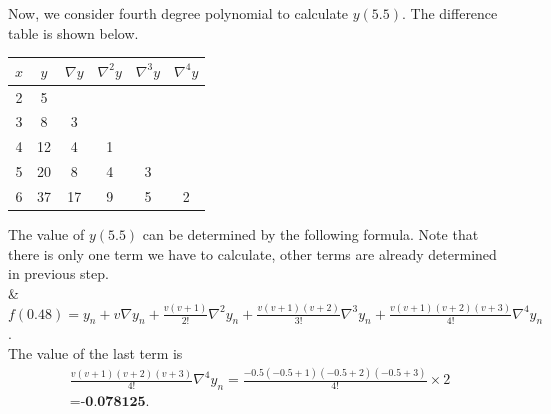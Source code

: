 \documentclass{beamer}
\begin{document}
\begin{frame}{}
    
Now, we consider fourth degree polynomial to calculate $y(5.5)$. The difference table is shown below.

\begin{center}
\begin{tabular}{|c|c|c|c|c|c|}
\hline
$x$ & $y$ & $\nabla y$ & $\nabla^{2} y$ & $\nabla^{3} y$ & $\nabla^{4} y$ \\
\hline
2 & 5 &  &  &  &  \\
\hline
3 & 8 & 3 &  &  &  \\
\hline
4 & 12 & 4 & 1 &  &  \\
\hline
5 & 20 & 8 & 4 & 3 &  \\
\hline
6 & 37 & 17 & 9 & 5 & 2 \\
\hline
\end{tabular}
\end{center}
The value of $y(5.5)$ can be determined by the following formula. Note that there is only one term we have to calculate, other terms are already determined in previous step.\\
& $f(0.48)=y_{n}+v \nabla y_{n}+\frac{v(v+1)}{2 !} \nabla^{2} y_{n}+\frac{v(v+1)(v+2)}{3 !} \nabla^{3} y_{n}+\frac{v(v+1)(v+2)(v+3)}{4 !} \nabla^{4} y_{n}$.\\
The value of the last term is
$$
\begin{aligned}
\frac{v(v+1)(v+2)(v+3)}{4 !} \nabla^{4} y_{n} 
=\frac{-0.5(-0.5+1)(-0.5+2)(-0.5+3)}{4 !} \times 2\\
\textbf{=-0.078125.}
\end{aligned}
$$
\end{frame}
\end{document}
